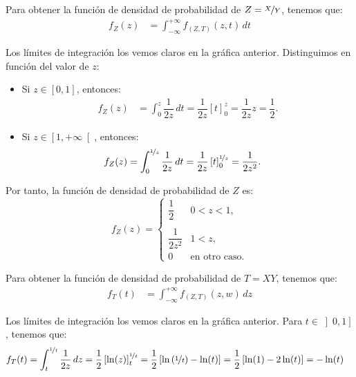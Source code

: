 \documentclass[12pt]{article}
\begin{document}
\begin{ejercicio}
\begin{enumerate}
            Para obtener la función de densidad de probabilidad de $Z=\nicefrac{X}{Y}$, tenemos que:
            \begin{align*}
                f_{Z}(z)&=\int_{-\infty}^{+\infty} f_{(Z,T)}(z, t) \, dt
            \end{align*}
    
            Los límites de integración los vemos claros en la gráfica anterior. Distinguimos en función del valor de $z$:
            \begin{itemize}
                \item Si $z\in [0,1]$, entonces:
                \begin{align*}
                    f_Z(z)&=\int_{0}^{z} \dfrac{1}{2z} \, dt = \dfrac{1}{2z}\left[t\right]_{0}^{z} = \dfrac{1}{2z}z = \dfrac{1}{2}.
                \end{align*}
    
                \item Si $z\in \left[1,+\infty\right[$, entonces:
                \begin{align*}
                    f_Z(z)&=\int_{0}^{\nicefrac{1}{z}} \dfrac{1}{2z} \, dt = \dfrac{1}{2z}\left[t\right]_{0}^{\nicefrac{1}{z}} = \dfrac{1}{2z^2}.
                \end{align*}
            \end{itemize}
    
            Por tanto, la función de densidad de probabilidad de $Z$ es:
            \begin{equation*}
                f_Z(z) = \begin{cases}
                    \dfrac{1}{2} & 0<z<1, \\ \\
                    \dfrac{1}{2z^2} & 1<z, \\
                    0 & \text{en otro caso}.
                \end{cases}
            \end{equation*}
    
            Para obtener la función de densidad de probabilidad de $T=XY$, tenemos que:
            \begin{align*}
                f_{T}(t)&=\int_{-\infty}^{+\infty} f_{(Z,T)}(z, w) \, dz
            \end{align*}
    
            Los límites de integración los vemos claros en la gráfica anterior. Para $t\in \left]0,1\right]$, tenemos que:
            \begin{align*}
                f_T(t)&=\int_{t}^{\nicefrac{1}{t}} \dfrac{1}{2z} \, dz = \dfrac{1}{2}\left[\ln(z)\right]_{t}^{\nicefrac{1}{t}} = \dfrac{1}{2}\left[\ln\left(\nicefrac{1}{t}\right)-\ln(t)\right]
                = \dfrac{1}{2}\left[\ln(1)-2\ln(t)\right] = -\ln(t)
            \end{align*}
    

\end{enumerate}
\end{ejercicio}
\end{document}
